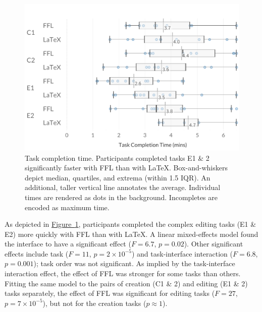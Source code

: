 \begin{figure}
    \centering
    \includegraphics[width=\linewidth]{fig/Timing.pdf}
    \caption{Task completion time. Participants completed tasks E1 \& 2 significantly faster with FFL than with LaTeX. \normalfont Box-and-whiskers depict median, quartiles, and extrema (within 1.5 IQR). An additional, taller vertical line annotates the average. Individual times are rendered as dots in the background. Incompletes are encoded as maximum time. }
    \label{fig:timing}
\end{figure}

As depicted in \hyperref[fig:timing]{Figure~\ref{fig:timing}}, participants completed the complex editing tasks (E1 \& E2) more quickly with FFL than with LaTeX. A linear mixed-effects model found the interface to have a significant effect ($F=6.7$, $p=0.02$). Other significant effects include task ($F=11$, $p=2\times10^{-5}$) and task-interface interaction ($F=6.8$, $p=0.001$); task order was not significant. As implied by the task-interface interaction effect, the effect of FFL was stronger for some tasks than others. Fitting the same model to the pairs of creation (C1 \& 2) and editing (E1 \& 2) tasks separately, the effect of FFL was significant for editing tasks ($F = 27$, $p=7\times10^{-5}$), but not for the creation tasks ($p\approx1$). 

